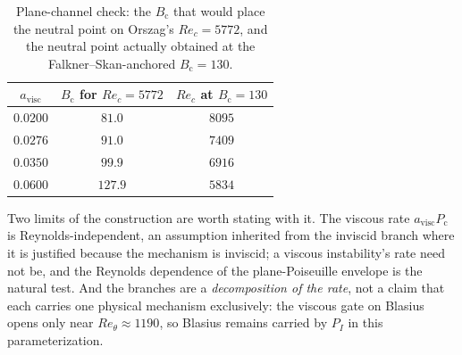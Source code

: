\begin{table}[tp]
  \centering\small
  \caption{Plane-channel check: the $B_{\mathrm c}$ that would place the
  neutral point on Orszag's $Re_c=5772$, and the neutral point actually
  obtained at the Falkner--Skan-anchored $B_{\mathrm c}=130$.}
  \label{tab:tschannel}
  \begin{tabular}{ccc}
    \toprule
    $a_{\mathrm{visc}}$ & $B_{\mathrm c}$ for $Re_c\!=\!5772$ & $Re_c$ at $B_{\mathrm c}\!=\!130$\\
    \midrule
    $0.0200$ & $81.0$  & $8095$\\
    $0.0276$ & $91.0$  & $7409$\\
    $0.0350$ & $99.9$  & $6916$\\
    $0.0600$ & $127.9$ & $5834$\\
    \bottomrule
  \end{tabular}
\end{table}

Two limits of the construction are worth stating with it. The viscous rate
$a_{\mathrm{visc}}P_{\mathrm{c}}$ is Reynolds-independent, an assumption
inherited from the inviscid branch where it is justified because the
mechanism is inviscid; a viscous instability's rate need not be, and the
Reynolds dependence of the plane-Poiseuille envelope is the natural test.
And the branches are a \emph{decomposition of the rate}, not a claim that
each carries one physical mechanism exclusively: the viscous gate on Blasius
opens only near $Re_\theta\!\approx\!1190$, so Blasius remains carried by
$P_I$ in this parameterization.
